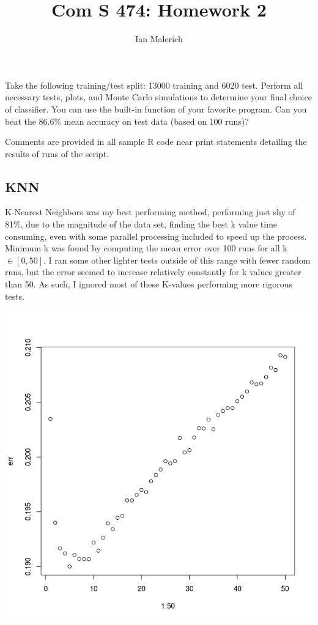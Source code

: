 \documentclass{jhwhw}
\author{Ian Malerich}
\title{Com S 474: Homework 2}
\begin{document}
\problem{}

    Take the following training/test split: 13000 training and 6020 test. Perform all
    necessary tests, plots, and Monte Carlo simulations to determine your final choice of classifier.
    You can use the built-in function of your favorite program. Can you beat the 86.6\% mean accuracy
    on test data (based on 100 runs)?

\solution

    \raggedright

    Comments are provided in all sample R code near print statements detailing
    the results of runs of the script. \\

    \subsection*{KNN}
    K-Nearest Neighbors was my best performing method, performing just shy of 81\%,
    due to the magnitude of the data set, finding the best k value time consuming,
    even with some parallel processing included to speed up the process.
    Minimum k was found by computing the mean error over 100 runs for all k 
    $\in [0,50]$. I ran some other lighter tests outside of this range with
    fewer random runs, but the error seemed to increase relatively constantly for 
    k values greater than 50. As such, I ignored most of these K-values performing
    more rigorous tests.
    \begin{center}
	\includegraphics[scale=0.5]{mink}
    \end{center}
    \inputminted[linenos,frame=lines,framesep=2mm]{R}{knn.R}
\end{document}

